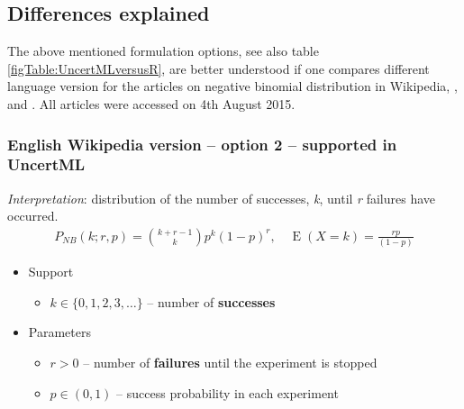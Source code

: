 \subsection*{Differences explained}
The above mentioned formulation options, see also table \ref{figTable:UncertMLversusR}, 
are better understood if one compares different language version for the articles on negative 
binomial distribution in Wikipedia, \cite{enWikipedia:2015}, \cite{frWikipedia:2015} and  \cite{gerWikipedia:2015}.
All articles were accessed on 4th August 2015.

\subsubsection*{English Wikipedia version -- option 2 -- supported in UncertML}
\textit{Interpretation}: distribution of the number of successes, \emph{k}, until \emph{r} failures have occurred.
\begin{align*}
P_{N\!B}(k;r,p) = {k + r - 1 \choose k} p^k (1-p)^r, \quad \operatorname E(X\!=\!k)=\frac{rp}{(1-p)}
\end{align*}
\begin{itemize}
\item 
Support
\begin{itemize}
\item 
$k \in \{ 0, 1, 2, 3, \dots\}$ -- number of \textbf{successes}
\end{itemize}
\item 
Parameters 
\begin{itemize}
\item 
$r > 0$ -- number of \textbf{failures} until the experiment is stopped
\item 
$p \in (0,1)$ -- success probability in each experiment
\end{itemize}
\end{itemize}

